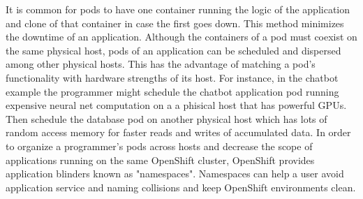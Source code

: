 \documentclass{article}
\begin{document}
It is common for pods to have one container running the logic of the application and clone of that container in case the first goes down. This method minimizes the downtime of an application. Although the containers of a pod must coexist on the same physical host, pods of an application can be scheduled and dispersed among other physical hosts. This has the advantage of matching a pod's functionality with hardware strengths of its host. For instance, in the chatbot example the programmer might schedule the chatbot application pod running expensive neural net computation on a a phisical host that has powerful GPUs. Then schedule the database pod on another physical host which has lots of random access memory for faster reads and writes of accumulated data. In order to organize a programmer's pods across hosts and decrease the scope of applications running on the same OpenShift cluster, OpenShift provides application blinders known as "namespaces". Namespaces can help a user avoid application service and naming collisions and keep OpenShift environments clean.
\end{document}

